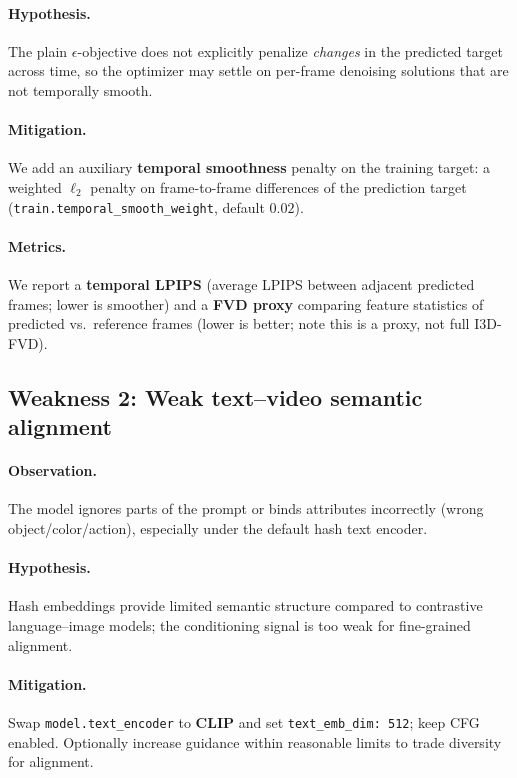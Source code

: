 \documentclass[11pt,a4paper]{article}
\begin{document}
\paragraph{Hypothesis.}
The plain $\epsilon$-objective does not explicitly penalize \emph{changes} in the predicted target across time, so the optimizer may settle on per-frame denoising solutions that are not temporally smooth.

\paragraph{Mitigation.}
We add an auxiliary \textbf{temporal smoothness} penalty on the training target: a weighted $\ell_2$ penalty on frame-to-frame differences of the prediction target (\texttt{train.temporal\_smooth\_weight}, default $0.02$).

\paragraph{Metrics.}
We report a \textbf{temporal LPIPS} (average LPIPS between adjacent predicted frames; lower is smoother) and a \textbf{FVD proxy} comparing feature statistics of predicted vs.\ reference frames (lower is better; note this is a proxy, not full I3D-FVD).

\subsection{Weakness 2: Weak text--video semantic alignment}
\paragraph{Observation.}
The model ignores parts of the prompt or binds attributes incorrectly (wrong object/color/action), especially under the default hash text encoder.

\paragraph{Hypothesis.}
Hash embeddings provide limited semantic structure compared to contrastive language--image models; the conditioning signal is too weak for fine-grained alignment.

\paragraph{Mitigation.}
Swap \texttt{model.text\_encoder} to \textbf{CLIP} and set \texttt{text\_emb\_dim: 512}; keep CFG enabled. Optionally increase guidance within reasonable limits to trade diversity for alignment.
\end{document}
